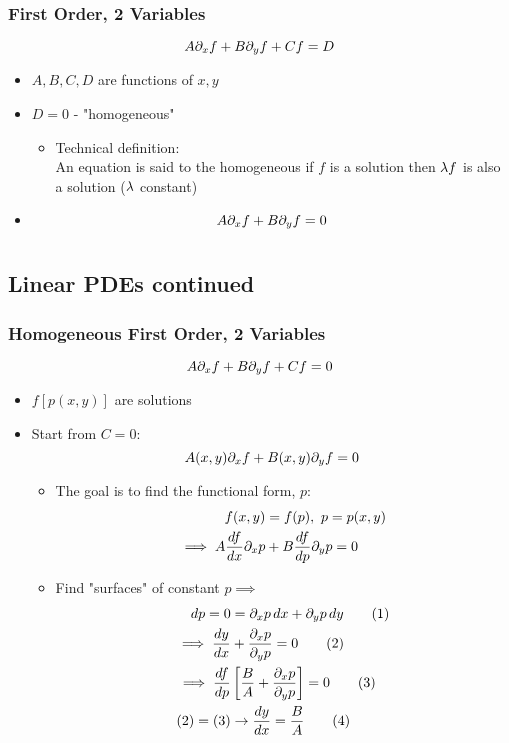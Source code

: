 \documentclass[Maths.tex]{subfiles}
\begin{document}
\subsection{First Order, 2 Variables}
\begin{equation*}
	A\partial_xf + B\partial_yf + Cf = D
\end{equation*}
\begin{itemize}
	\item $A,B,C,D$ are functions of $x,y$
	\item $D = 0$ - "homogeneous"
	\begin{itemize}
		\item Technical definition: \\
		An equation is said to the homogeneous if $f$ is a solution then $\lambda f$ is also a solution ($\lambda$ constant)
	\end{itemize}
	\item
	\begin{equation*}
		A\partial_xf + B\partial_yf = 0
	\end{equation*}
\end{itemize}

\chapter{}
\section{Linear PDEs continued}
\subsection{Homogeneous First Order, 2 Variables}
\begin{equation*}
	A\partial_xf + B\partial_yf + Cf = 0
\end{equation*}
\begin{itemize}
	\item $f[p(x,y)]$ are solutions
	\item Start from $C=0$:
	\begin{equation*}
		A(x,y)\partial_xf + B(x,y)\partial_yf = 0
	\end{equation*}
	\begin{itemize}
		\item The goal is to find the functional form, $p$:
		\begin{align*}
			f(x,y) &= f(p),~ p = p(x,y) \\
			\implies A\frac{df}{dx}\partial_xp &+ B\frac{df}{dp}\partial_yp = 0
		\end{align*}
		\item Find "surfaces" of constant $p \implies$
		\begin{align}
			dp = 0 &= \partial_xp\,dx + \partial_yp\,dy \tag{1} \\
			\implies \frac{dy}{dx} &+ \frac{\partial_xp}{\partial_yp} = 0 \tag{2} \\
			\implies \frac{df}{dp}&\left[\frac{B}{A} + \frac{\partial_xp}{\partial_yp}\right] = 0 \tag{3} \\
			(2) = (3) &\to \frac{dy}{dx} = \frac{B}{A} \tag{4}
		\end{align}
	\end{itemize}
\end{itemize}
\end{document}
